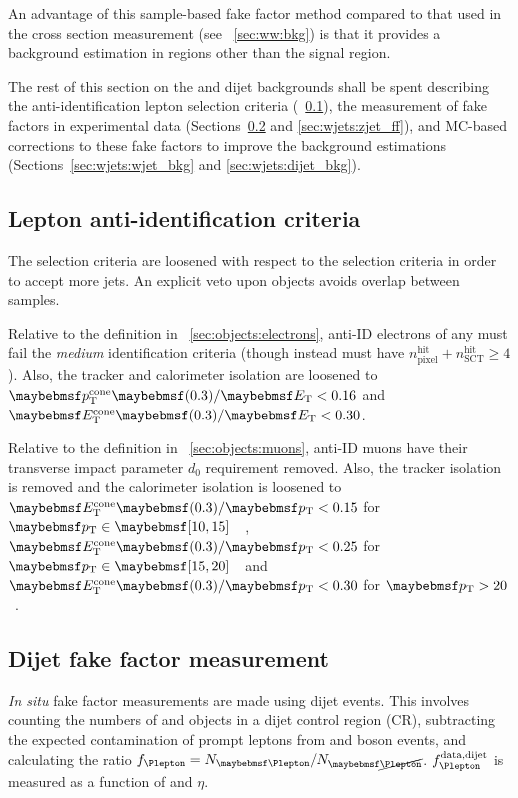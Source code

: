 An advantage of this sample-based fake factor method compared to that used in the \WW cross 
section measurement (see \Section~\ref{sec:ww:bkg}) is that it provides a background 
estimation in regions other than the signal region.

The rest of this section on the \Wjets and dijet backgrounds shall be spent describing 
the anti-identification lepton selection criteria (\Section~\ref{sec:wjets:antiid}), the 
measurement of fake factors in experimental data (Sections~\ref{sec:wjets:dijet_ff} and 
\ref{sec:wjets:zjet_ff}), and MC-based corrections to these fake factors to improve the 
background estimations (Sections~\ref{sec:wjets:wjet_bkg} and \ref{sec:wjets:dijet_bkg}).



\subsection{Lepton anti-identification criteria}
\label{sec:wjets:antiid}

The \antiid{\Plepton} selection criteria are loosened with respect to the \id{\Plepton} 
selection criteria in order to accept more jets. An explicit veto upon \id{\Plepton} objects 
avoids overlap between samples.

Relative to the \id{\Pe} definition in \Section~\ref{sec:objects:electrons}, anti-ID 
electrons of any \pt must fail the \textit{medium} identification criteria (though instead 
must have $n_{\text{pixel}}^{\text{hit}} + n_{\text{SCT}}^{\text{hit}} \geq 4$). Also, the 
tracker and calorimeter isolation are loosened to $\ptcone{0.3}/\et < 0.16$ and 
$\etcone{0.3}/\et < 0.30$.

Relative to the \id{\Pmu} definition in \Section~\ref{sec:objects:muons}, anti-ID muons have 
their transverse impact parameter $d_0$ requirement removed. Also, the tracker isolation is 
removed and the calorimeter isolation is loosened to $\etcone{0.3}/\pt < 0.15$ for 
\unit{$\pt \in \hardrange{10,15}$}{\GeV}, $\etcone{0.3}/\pt < 0.25$ for 
\unit{$\pt \in \hardrange{15,20}$}{\GeV} and $\etcone{0.3}/\pt < 0.30$ for 
\unit{$\pt > 20$}{\GeV}.



\subsection{Dijet fake factor measurement}
\label{sec:wjets:dijet_ff}

\textit{In situ} fake factor measurements are made using dijet events. This involves 
counting the numbers of \id{\Plepton} and \antiid{\Plepton} objects in a dijet control 
region (CR), subtracting the expected contamination of prompt leptons from \PW and \PZ boson 
events, and calculating the ratio $f_{\Plepton}=N_{\id{\Plepton}}/N_{\antiid{\Plepton}}$. 
$f_{\Plepton}^{\text{data,dijet}}$ is measured as a function of \pt and $\eta$.


